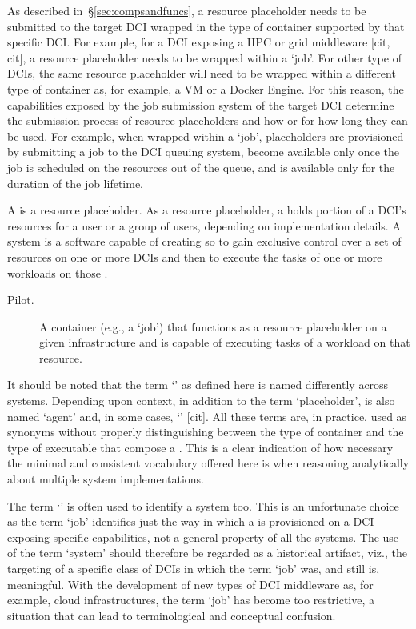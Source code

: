 \documentclass{sig-alternate}
\begin{document}
As described in~\S\ref{sec:compsandfuncs}, a resource placeholder needs to be
submitted to the target DCI wrapped in the type of container supported by that
specific DCI. For example, for a DCI exposing a HPC or grid middleware [cit,
cit], a resource placeholder needs to be wrapped within a `job'. For other type
of DCIs, the same resource placeholder will need to be wrapped within a
different type of container as, for example, a VM or a Docker Engine. For this
reason, the capabilities exposed by the job submission system of the target DCI
determine the submission process of resource placeholders and how or for how
long they can be used. For example, when wrapped within a `job', placeholders
are provisioned by submitting a job to the DCI queuing system, become available
only once the job is scheduled on the resources out of the queue, and is
available only for the duration of the job lifetime.

A \pilot is a resource placeholder. As a resource placeholder, a \pilot holds
portion of a DCI's resources for a user or a group of users, depending on
implementation details. A \pilot system is a software capable of creating
\pilots so to gain exclusive control over a set of resources on one or more DCIs
and then to execute the tasks of one or more workloads on those \pilots.

\begin{description}

\item[Pilot.] A container (e.g., a `job') that functions as a resource
placeholder on a given infrastructure and is capable of executing tasks of a
workload on that resource.

\end{description}

It should be noted that the term `\pilot' as defined here is named differently
across \pilot systems. Depending upon context, in addition to the term
`placeholder', \pilot is also named `agent' and, in some cases, `\pilotjob'
[cit]. All these terms are, in practice, used as synonyms without properly
distinguishing between the type of container and the type of executable that
compose a \pilot. This is a clear indication of how necessary the minimal and
consistent vocabulary offered here is when reasoning analytically about
multiple \pilot system implementations.

The term `\pilotjob' is often used to identify a \pilot system too. This is an
unfortunate choice as the term `job' identifies just the way in which a \pilot
is provisioned on a DCI exposing specific capabilities, not a general
property of all the \pilot systems. The use of the term `\pilotjob system'
should therefore be regarded as a historical artifact, viz., the targeting of a
specific class of DCIs in which the term `job' was, and still is, meaningful.
With the development of new types of DCI middleware as, for example, cloud
infrastructures, the term `job' has become too restrictive, a situation that
can lead to terminological and conceptual confusion.
\end{document}
